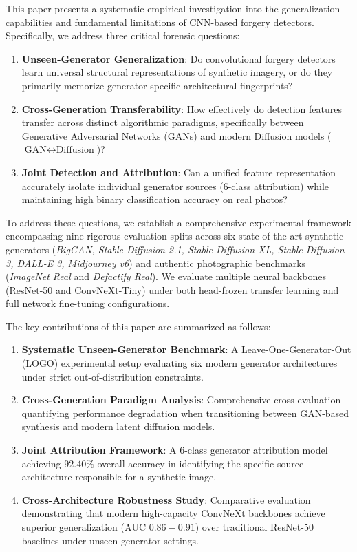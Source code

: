 \documentclass[pdflatex,sn-mathphys-num]{sn-jnl}
\theoremstyle{thmstyleone}
\theoremstyle{thmstyletwo}
\theoremstyle{thmstylethree}
\begin{document}
This paper presents a systematic empirical investigation into the generalization capabilities and fundamental limitations of CNN-based forgery detectors. Specifically, we address three critical forensic questions:
\begin{enumerate}
    \item \textbf{Unseen-Generator Generalization}: Do convolutional forgery detectors learn universal structural representations of synthetic imagery, or do they primarily memorize generator-specific architectural fingerprints?
    \item \textbf{Cross-Generation Transferability}: How effectively do detection features transfer across distinct algorithmic paradigms, specifically between Generative Adversarial Networks (GANs) and modern Diffusion models ($\text{GAN} \leftrightarrow \text{Diffusion}$)?
    \item \textbf{Joint Detection and Attribution}: Can a unified feature representation accurately isolate individual generator sources (6-class attribution) while maintaining high binary classification accuracy on real photos?
\end{enumerate}

To address these questions, we establish a comprehensive experimental framework encompassing nine rigorous evaluation splits across six state-of-the-art synthetic generators (\textit{BigGAN, Stable Diffusion 2.1, Stable Diffusion XL, Stable Diffusion 3, DALL-E 3, Midjourney v6}) and authentic photographic benchmarks (\textit{ImageNet Real} and \textit{Defactify Real}). We evaluate multiple neural backbones (ResNet-50 and ConvNeXt-Tiny) under both head-frozen transfer learning and full network fine-tuning configurations.

The key contributions of this paper are summarized as follows:
\begin{enumerate}
    \item \textbf{Systematic Unseen-Generator Benchmark}: A Leave-One-Generator-Out (LOGO) experimental setup evaluating six modern generator architectures under strict out-of-distribution constraints.
    \item \textbf{Cross-Generation Paradigm Analysis}: Comprehensive cross-evaluation quantifying performance degradation when transitioning between GAN-based synthesis and modern latent diffusion models.
    \item \textbf{Joint Attribution Framework}: A 6-class generator attribution model achieving $92.40\%$ overall accuracy in identifying the specific source architecture responsible for a synthetic image.
    \item \textbf{Cross-Architecture Robustness Study}: Comparative evaluation demonstrating that modern high-capacity ConvNeXt backbones achieve superior generalization ($\text{AUC } 0.86 - 0.91$) over traditional ResNet-50 baselines under unseen-generator settings.
\end{enumerate}
\end{document}
